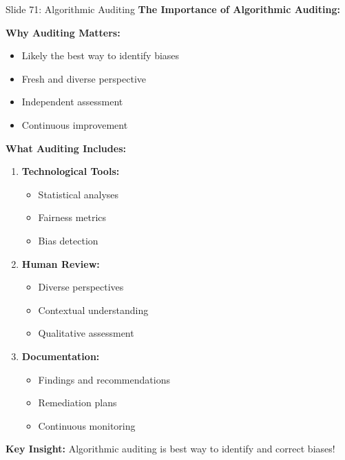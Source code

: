 \documentclass[8pt]{beamer}
\begin{document}
	\begin{frame}{Slide 71: Algorithmic Auditing}
		\fontsize{6.5}{7.5}\selectfont
		\textbf{The Importance of Algorithmic Auditing:}
		
		\vspace{0.1cm}
		\textbf{Why Auditing Matters:}
		\begin{itemize}
			\item Likely the best way to identify biases
			\item Fresh and diverse perspective
			\item Independent assessment
			\item Continuous improvement
		\end{itemize}
		
		\vspace{0.1cm}
		\textbf{What Auditing Includes:}
		\begin{enumerate}
			\item \textbf{Technological Tools:}
			\begin{itemize}
				\item Statistical analyses
				\item Fairness metrics
				\item Bias detection
			\end{itemize}
			\item \textbf{Human Review:}
			\begin{itemize}
				\item Diverse perspectives
				\item Contextual understanding
				\item Qualitative assessment
			\end{itemize}
			\item \textbf{Documentation:}
			\begin{itemize}
				\item Findings and recommendations
				\item Remediation plans
				\item Continuous monitoring
			\end{itemize}
		\end{enumerate}
		
		\textcolor{myblue}{\textbf{Key Insight:}} Algorithmic auditing is \textcolor{myblue}{best way to identify and correct biases}!
	\end{frame}
	
\end{document}
